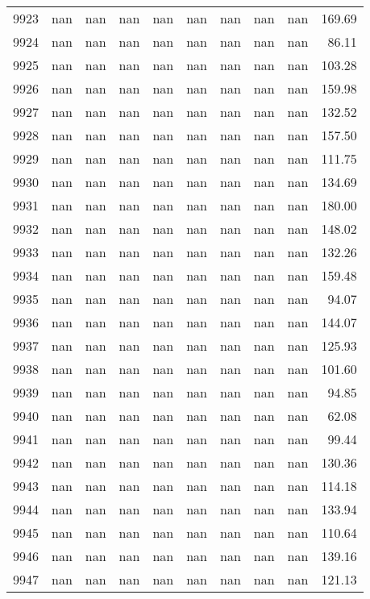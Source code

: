 \begin{tabular}{lrrrrrrrrr}
9923 & nan & nan & nan & nan & nan & nan & nan & nan & 169.69 \\
9924 & nan & nan & nan & nan & nan & nan & nan & nan & 86.11 \\
9925 & nan & nan & nan & nan & nan & nan & nan & nan & 103.28 \\
9926 & nan & nan & nan & nan & nan & nan & nan & nan & 159.98 \\
9927 & nan & nan & nan & nan & nan & nan & nan & nan & 132.52 \\
9928 & nan & nan & nan & nan & nan & nan & nan & nan & 157.50 \\
9929 & nan & nan & nan & nan & nan & nan & nan & nan & 111.75 \\
9930 & nan & nan & nan & nan & nan & nan & nan & nan & 134.69 \\
9931 & nan & nan & nan & nan & nan & nan & nan & nan & 180.00 \\
9932 & nan & nan & nan & nan & nan & nan & nan & nan & 148.02 \\
9933 & nan & nan & nan & nan & nan & nan & nan & nan & 132.26 \\
9934 & nan & nan & nan & nan & nan & nan & nan & nan & 159.48 \\
9935 & nan & nan & nan & nan & nan & nan & nan & nan & 94.07 \\
9936 & nan & nan & nan & nan & nan & nan & nan & nan & 144.07 \\
9937 & nan & nan & nan & nan & nan & nan & nan & nan & 125.93 \\
9938 & nan & nan & nan & nan & nan & nan & nan & nan & 101.60 \\
9939 & nan & nan & nan & nan & nan & nan & nan & nan & 94.85 \\
9940 & nan & nan & nan & nan & nan & nan & nan & nan & 62.08 \\
9941 & nan & nan & nan & nan & nan & nan & nan & nan & 99.44 \\
9942 & nan & nan & nan & nan & nan & nan & nan & nan & 130.36 \\
9943 & nan & nan & nan & nan & nan & nan & nan & nan & 114.18 \\
9944 & nan & nan & nan & nan & nan & nan & nan & nan & 133.94 \\
9945 & nan & nan & nan & nan & nan & nan & nan & nan & 110.64 \\
9946 & nan & nan & nan & nan & nan & nan & nan & nan & 139.16 \\
9947 & nan & nan & nan & nan & nan & nan & nan & nan & 121.13 \\

\end{tabular}
